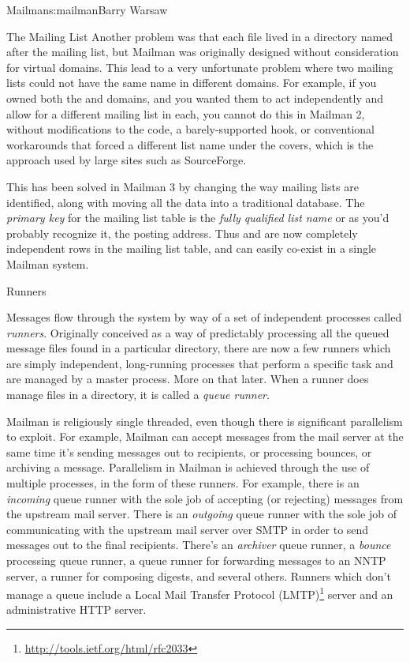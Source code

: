 \begin{aosachapter}{Mailman}{s:mailman}{Barry Warsaw}
\begin{aosasect1}{The Mailing List}
Another problem was that each  file lived in a
directory named after the mailing list, but Mailman was originally
designed without consideration for virtual domains.  This lead to a
very unfortunate problem where two mailing lists could not have the
same name in different domains.  For example, if you owned both the
 and  domains, and you wanted them
to act independently and allow for a different  mailing
list in each, you cannot do this in Mailman 2, without modifications
to the code, a barely-supported hook, or conventional workarounds that
forced a different list name under the covers, which is the approach
used by large sites such as SourceForge.

This has been solved in Mailman 3 by changing the way mailing lists
are identified, along with moving all the data into a traditional
database.  The \emph{primary key} for the mailing list table is the
\emph{fully qualified list name} or as you'd probably recognize it,
the posting address.  Thus  and
 are now completely independent rows in the
mailing list table, and can easily co-exist in a single Mailman
system.

\end{aosasect1}

\begin{aosasect1}{Runners}

Messages flow through the system by way of a set of independent
processes called \emph{runners}.  Originally conceived as a way of
predictably processing all the queued message files found in a
particular directory, there are now a few runners which are simply
independent, long-running processes that perform a specific task and
are managed by a master process.  More on that later.  When a runner
does manage files in a directory, it is called a \emph{queue runner}.

Mailman is religiously single threaded, even though there is
significant parallelism to exploit.  For example, Mailman can accept
messages from the mail server at the same time it's sending messages
out to recipients, or processing bounces, or archiving a message.
Parallelism in Mailman is achieved through the use of multiple
processes, in the form of these runners.  For example, there is an
\emph{incoming} queue runner with the sole job of accepting (or
rejecting) messages from the upstream mail server.  There is an
\emph{outgoing} queue runner with the sole job of communicating with
the upstream mail server over SMTP in order to send messages out to
the final recipients.  There's an \emph{archiver} queue runner, a
\emph{bounce} processing queue runner, a queue runner for forwarding
messages to an NNTP server, a runner for composing digests, and
several others.  Runners which don't manage a queue include a Local
Mail Transfer Protocol
(LMTP)\footnote{\url{http://tools.ietf.org/html/rfc2033}} server and
an administrative HTTP server.


\end{aosasect1}
\end{aosachapter}
